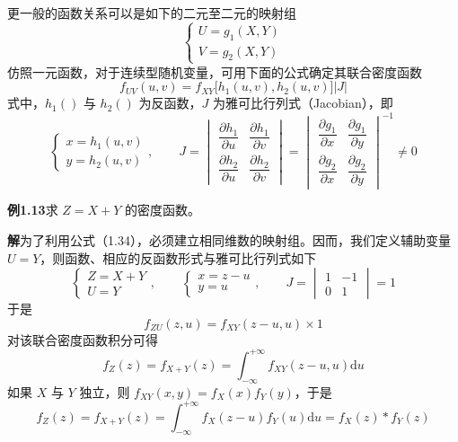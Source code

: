 \documentclass[11pt,openany,UTF8]{ctexbook}
\newcommand{\dif}{\mathrm{d}}                      %
\begin{document}
更一般的函数关系可以是如下的二元至二元的映射组
\begin{equation}
\begin{cases}
U=g_1(X,Y)\\
V=g_2(X,Y)
\end{cases}
\label{eq:1.33}
\end{equation}
仿照一元函数\nobreak，对于连续型随机变量\nobreak，可用下面的公式确定其联合密度函数
\begin{equation}
f_{UV}(u,v)=f_{XY}\bigl[h_1(u,v),h_2(u,v)\bigr]\lvert J\rvert
\label{eq:1.34}
\end{equation}
式中\nobreak，$h_1()$ 与 $h_2()$ 为反函数\nobreak，$J$ 为雅可比行列式（Jacobian\nobreak）\nobreak，即
\begin{equation}
\begin{cases}
x=h_1(u,v)\\
y=h_2(u,v)
\end{cases},\qquad
J=\begin{vmatrix}
\dfrac{\partial h_1}{\partial u} & \dfrac{\partial h_1}{\partial v}\\[10pt]
\dfrac{\partial h_2}{\partial u} & \dfrac{\partial h_2}{\partial v}
\end{vmatrix}
=\begin{vmatrix}
\dfrac{\partial g_1}{\partial x} & \dfrac{\partial g_1}{\partial y}\\[10pt]
\dfrac{\partial g_2}{\partial x} & \dfrac{\partial g_2}{\partial y}
\end{vmatrix}^{-1}\neq 0
\label{eq:1.35}
\end{equation}

\begin{examplebox}
\textbf{例1.13}\quad 求 $Z=X+Y$ 的密度函数\nobreak。

\textbf{解}\quad 为了利用公式（1.34\nobreak）\nobreak，必须建立相同维数的映射组\nobreak。因而\nobreak，我们定义辅助变量 $U=Y$\nobreak，则函数\nobreak、相应的反函数形式与雅可比行列式如下
\[
\begin{cases}
Z=X+Y\\
U=Y
\end{cases},\qquad
\begin{cases}
x=z-u\\
y=u
\end{cases},\qquad
J=\begin{vmatrix}
1 & -1\\
0 & 1
\end{vmatrix}=1
\]
于是
\[
f_{ZU}(z,u)=f_{XY}(z-u,u)\times 1
\]
对该联合密度函数积分可得
\begin{equation}
f_Z(z)=f_{X+Y}(z)=\int_{-\infty}^{+\infty}f_{XY}(z-u,u)\dif u
\label{eq:1.36}
\end{equation}
如果 $X$ 与 $Y$ 独立\nobreak，则 $f_{XY}(x,y)=f_X(x)f_Y(y)$\nobreak，于是
\begin{equation}
f_Z(z)=f_{X+Y}(z)=\int_{-\infty}^{+\infty}f_X(z-u)f_Y(u)\dif u=f_X(z)*f_Y(z)
\label{eq:1.37}
\end{equation}
\end{examplebox}
\end{document}
